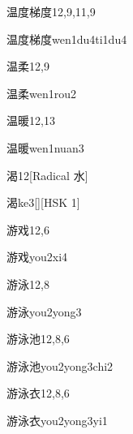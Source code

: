 \begin{entry}{温度梯度}{12,9,11,9}
  \begin{phonetics}{温度梯度}{wen1du4ti1du4}
  \end{phonetics}
\end{entry}

\begin{entry}{温柔}{12,9}
  \begin{phonetics}{温柔}{wen1rou2}
  \end{phonetics}
\end{entry}

\begin{entry}{温暖}{12,13}
  \begin{phonetics}{温暖}{wen1nuan3}
  \end{phonetics}
\end{entry}

\begin{entry}{渴}{12}[Radical 水]
  \begin{phonetics}{渴}{ke3}[][HSK 1]
  \end{phonetics}
\end{entry}

\begin{entry}{游戏}{12,6}
  \begin{phonetics}{游戏}{you2xi4}
  \end{phonetics}
\end{entry}

\begin{entry}{游泳}{12,8}
  \begin{phonetics}{游泳}{you2yong3}
  \end{phonetics}
\end{entry}

\begin{entry}{游泳池}{12,8,6}
  \begin{phonetics}{游泳池}{you2yong3chi2}
  \end{phonetics}
\end{entry}

\begin{entry}{游泳衣}{12,8,6}
  \begin{phonetics}{游泳衣}{you2yong3yi1}
  \end{phonetics}
\end{entry}

